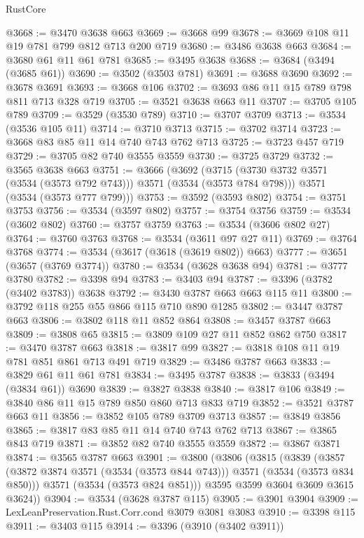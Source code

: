 \begin{lexlean}{RustCore}
\begin{coremodule}
@3668 := @3470 @3638 @663
@3669 := @3668 @99
@3678 := @3669 @108 @11 @19 @781 @799 @812 @713 @200 @719
@3680 := @3486 @3638 @663
@3684 := @3680 @61 @11 @61 @781
@3685 := @3495 @3638
@3688 := @3684 (@3494 (@3685 @61))
@3690 := @3502 (@3503 @781)
@3691 := @3688 @3690
@3692 := @3678 @3691
@3693 := @3668 @106
@3702 := @3693 @86 @11 @15 @789 @798 @811 @713 @328 @719
@3705 := @3521 @3638 @663 @11
@3707 := @3705 @105 @789
@3709 := @3529 (@3530 @789)
@3710 := @3707 @3709
@3713 := @3534 (@3536 @105 @11)
@3714 := @3710 @3713
@3715 := @3702 @3714
@3723 := @3668 @83 @85 @11 @14 @740 @743 @762 @713
@3725 := @3723 @457 @719
@3729 := @3705 @82 @740 @3555 @3559
@3730 := @3725 @3729
@3732 := @3565 @3638 @663
@3751 := @3666
    (@3692
      (@3715 (@3730 @3732 @3571 (@3534 (@3573 @792 @743))) @3571 (@3534 (@3573 @784 @798)))
      @3571
      (@3534 (@3573 @777 @799)))
@3753 := @3592 (@3593 @802)
@3754 := @3751 @3753
@3756 := @3534 (@3597 @802)
@3757 := @3754 @3756
@3759 := @3534 (@3602 @802)
@3760 := @3757 @3759
@3763 := @3534 (@3606 @802 @27)
@3764 := @3760 @3763
@3768 := @3534 (@3611 @97 @27 @11)
@3769 := @3764 @3768
@3774 := @3534 (@3617 (@3618 (@3619 @802)) @663)
@3777 := @3651 (@3657 (@3769 @3774))
@3780 := @3534 (@3628 @3638 @94)
@3781 := @3777 @3780
@3782 := @3398 @94
@3783 := @3403 @94
@3787 := @3396 (@3782 (@3402 @3783)) @3638
@3792 := @3430 @3787 @663 @663 @115 @11
@3800 := @3792 @118 @255 @55 @866 @115 @710 @890 @1285
@3802 := @3447 @3787 @663
@3806 := @3802 @118 @11 @852 @864
@3808 := @3457 @3787 @663
@3809 := @3808 @65
@3815 := @3809 @109 @27 @11 @852 @862 @750
@3817 := @3470 @3787 @663
@3818 := @3817 @99
@3827 := @3818 @108 @11 @19 @781 @851 @861 @713 @491 @719
@3829 := @3486 @3787 @663
@3833 := @3829 @61 @11 @61 @781
@3834 := @3495 @3787
@3838 := @3833 (@3494 (@3834 @61)) @3690
@3839 := @3827 @3838
@3840 := @3817 @106
@3849 := @3840 @86 @11 @15 @789 @850 @860 @713 @833 @719
@3852 := @3521 @3787 @663 @11
@3856 := @3852 @105 @789 @3709 @3713
@3857 := @3849 @3856
@3865 := @3817 @83 @85 @11 @14 @740 @743 @762 @713
@3867 := @3865 @843 @719
@3871 := @3852 @82 @740 @3555 @3559
@3872 := @3867 @3871
@3874 := @3565 @3787 @663
@3901 := @3800
    (@3806
      (@3815
        (@3839
          (@3857 (@3872 @3874 @3571 (@3534 (@3573 @844 @743))) @3571 (@3534 (@3573 @834 @850)))
          @3571
          (@3534 (@3573 @824 @851)))
        @3595
        @3599
        @3604
        @3609
        @3615
        @3624))
@3904 := @3534 (@3628 @3787 @115)
@3905 := @3901 @3904
@3909 := LexLeanPreservation.Rust.Corr.cond @3079 @3081 @3083
@3910 := @3398 @115
@3911 := @3403 @115
@3914 := @3396 (@3910 (@3402 @3911))

\end{coremodule}
\end{lexlean}
